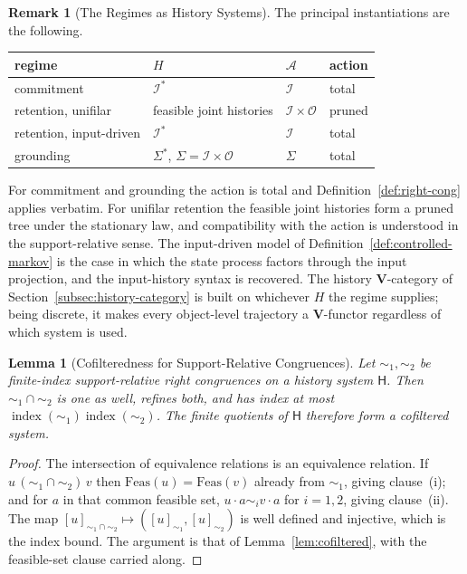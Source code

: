 \documentclass[12pt]{article}
\newtheorem{lemma}[theorem]{Lemma}
\theoremstyle{definition}
\newtheorem{remark}[theorem]{Remark}
\begin{document}
\begin{remark}[The Regimes as History Systems]
\label{rem:regime-history-instances}
The principal instantiations are the following.

\begin{center}
\begin{tabular}{@{}llp{3.1cm}l@{}}
\toprule
regime & $H$ & $\mathcal A$ & action \\
\midrule
commitment & $\mathcal I^*$ & $\mathcal I$ & total \\
retention, unifilar & feasible joint histories
& $\mathcal I\times\mathcal O$ & pruned \\
retention, input-driven & $\mathcal I^*$ & $\mathcal I$ & total \\
grounding & $\Sigma^*$, $\Sigma=\mathcal I\times\mathcal O$ & $\Sigma$ & total \\
\bottomrule
\end{tabular}
\end{center}

For commitment and grounding the action is total and
Definition~\ref{def:right-cong} applies verbatim.  For unifilar retention the
feasible joint histories form a pruned tree under the stationary law, and
compatibility with the action is understood in the support-relative sense.  The
input-driven model of Definition~\ref{def:controlled-markov} is the case in
which the state process factors through the input projection, and the
input-history syntax is recovered.  The history $\mathbf V$-category of
Section~\ref{subsec:history-category} is built on whichever $H$ the regime
supplies; being discrete, it makes every object-level trajectory a
$\mathbf V$-functor regardless of which system is used.
\end{remark}

\begin{lemma}[Cofilteredness for Support-Relative Congruences]
\label{lem:cofiltered-support}
Let $\sim_1,\sim_2$ be finite-index support-relative right congruences on a
history system $\mathsf H$.  Then $\sim_1\cap\sim_2$ is one as well, refines
both, and has index at most
$\operatorname{index}(\sim_1)\operatorname{index}(\sim_2)$.  The finite
quotients of $\mathsf H$ therefore form a cofiltered system.
\end{lemma}

\begin{proof}
The intersection of equivalence relations is an equivalence relation.  If
$u\,(\sim_1\cap\sim_2)\,v$ then $\mathrm{Feas}(u)=\mathrm{Feas}(v)$ already
from $\sim_1$, giving clause~(i); and for $a$ in that common feasible set,
$u\cdot a\sim_iv\cdot a$ for $i=1,2$, giving clause~(ii).  The map
$[u]_{\sim_1\cap\sim_2}\mapsto([u]_{\sim_1},[u]_{\sim_2})$ is well defined and
injective, which is the index bound.  The argument is that of
Lemma~\ref{lem:cofiltered}, with the feasible-set clause carried along.
\end{proof}
\end{document}
